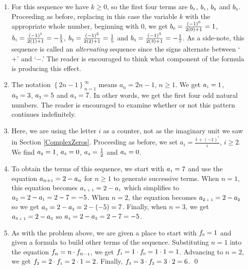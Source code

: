 \documentclass{ximera}
\begin{document}
\begin{example}
\begin{enumerate}
\item For this sequence we have $k \geq 0$, so the first four terms are $b_{\text{\tiny$0$}}$, $b_{\text{\tiny$1$}}$, $b_{\text{\tiny$2$}}$ and $b_{\text{\tiny$3$}}$.  Proceeding as before, replacing in this case the variable $k$ with the appropriate whole number, beginning with $0$, we get $b_{\text{\tiny$0$}} = \frac{(-1)^{0}}{2(0)+1} = 1$, $b_{\text{\tiny$1$}} = \frac{(-1)^{1}}{2(1)+1} = - \frac{1}{3}$, $b_{\text{\tiny$2$}} = \frac{(-1)^{2}}{2(2)+1} = \frac{1}{5}$ and $b_{\text{\tiny$3$}} =  \frac{(-1)^{3}}{2(3)+1} = -\frac{1}{7}$.  As a side-note, this sequence is called an  \textit{alternating} sequence since the signs alternate between `$+$' and `$-$.' The reader is encouraged to think what component of the formula is producing this effect.

\item  The notation $\left\{ 2n - 1 \right\}_{n=1}^{\infty}$ means  $a_{n} = 2n -1$, $n \geq 1$.  We get $a_{\text{\tiny$1$}} = 1$, $a_{\text{\tiny$2$}} = 3$, $a_{\text{\tiny$3$}} = 5$ and $a_{\text{\tiny$4$}} = 7$.  In other words, we get the first four odd natural numbers.  The reader is encouraged to examine whether or not this pattern continues indefinitely.

\item  Here, we are using the letter $i$ as a counter, not as the imaginary unit we saw in Section \ref{ComplexZeros}.  Proceeding as before, we set $a_{i} = \frac{1 + (-1)^{i}}{i}$, $i \geq 2$.  We find $a_{\text{\tiny$2$}} = 1$, $a_{\text{\tiny$3$}} = 0$, $a_{\text{\tiny$4$}} = \frac{1}{2}$ and $a_{\text{\tiny$5$}} = 0$.  

\item  To obtain the terms of this sequence, we start with $a_{\text{\tiny$1$}} = 7$ and use the equation $a_{n \text{+\tiny$1$}} = 2 - a_{n}$ for $n \geq 1$ to generate successive terms.  When $n = 1$, this equation becomes $a_{\text{\tiny$1 + 1$}} = 2 - a_{\text{\tiny$1$}}$ which simplifies to $a_{\text{\tiny$2$}} = 2 - a_{\text{\tiny$1$}} = 2 - 7 = -5$.  When $n = 2$, the equation becomes $a_{\text{\tiny$2 + 1$}} = 2 - a_{\text{\tiny$2$}}$ so we get $a_{\text{\tiny$3$}} = 2 - a_{\text{\tiny$2$}} = 2 - (-5) = 7$.  Finally, when $n = 3$, we get $a_{\text{\tiny$3 + 1$}} = 2 - a_{\text{\tiny$3$}}$ so $a_{\text{\tiny$4$}} = 2 - a_{\text{\tiny$3$}} = 2-7 = -5$.  

\item  As with the problem above, we are given a place to start with $f_{\text{\tiny$0$}} = 1$ and given a formula to build other terms of the sequence.  Substituting $n = 1$ into the equation $f_{n} = n \cdot f_{n-\text{\tiny$1$}}$, we get $f_{\text{\tiny$1$}} = 1 \cdot f_{\text{\tiny$0$}} = 1 \cdot 1 = 1$.  Advancing to $n = 2$, we get $f_{\text{\tiny$2$}} = 2 \cdot f_{\text{\tiny$1$}} = 2 \cdot 1 = 2$.  Finally, $f_{\text{\tiny$3$}} = 3 \cdot f_{\text{\tiny$2$}} = 3 \cdot 2 = 6$.  \qed

\end{enumerate}

\end{example}
\end{document}
